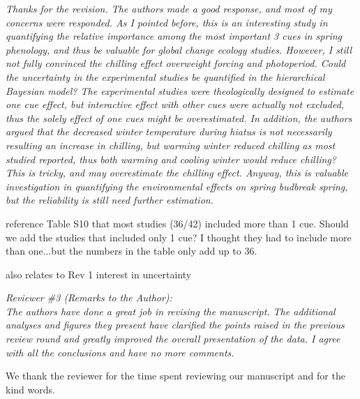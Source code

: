 \documentclass[11pt, a4paper]{article}
\begin{document}
\emph{Thanks for the revision. The authors made a good response, and most of my concerns were responded. As I pointed before, this is an interesting study in quantifying the relative importance among the most important 3 cues in spring phenology, and thus be valuable for global change ecology studies. However, I still not fully convinced the chilling effect overweight forcing and photoperiod. Could the uncertainty in the experimental studies be quantified in the hierarchical Bayesian model? The experimental studies were theologically designed to estimate one cue effect, but interactive effect with other cues were actually not excluded, thus the solely effect of one cues might be overestimated. In addition, the authors argued that the decreased winter temperature during hiatus is not necessarily resulting an increase in chilling, but warming winter reduced chilling as most studied reported, thus both warming and cooling winter would reduce chilling? This is tricky, and may overestimate
the chilling effect. Anyway, this is valuable investigation in quantifying the environmental effects on spring budbreak spring, but the reliability is still need further estimation.
}\\

\par reference Table  S10 that most studies (36/42)  included more than 1 cue. Should we add the studies that included only 1 cue? I thought they had to include more than one...but the numbers in the table only add up to 36.
\par also relates to Rev 1 interest in uncertainty

 \emph{Reviewer \#3 (Remarks to the Author):}\\

\emph{The authors have done a great job in revising the manuscript. The additional analyses and figures they present have clarified the points raised in the previous review round and greatly improved the overall presentation of the data. I agree with all the conclusions and have no more comments.}

\par We thank the reviewer for the time spent reviewing our manuscript and for the kind words. 

\end{document}
